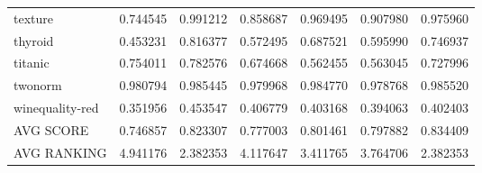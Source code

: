 \begin{tabular}{lrrrrrr}
texture         &         0.744545 &  0.991212 &                  0.858687 &       0.969495 &                  0.907980 &       0.975960 \\
thyroid         &         0.453231 &  0.816377 &                  0.572495 &       0.687521 &                  0.595990 &       0.746937 \\
titanic         &         0.754011 &  0.782576 &                  0.674668 &       0.562455 &                  0.563045 &       0.727996 \\
twonorm         &         0.980794 &  0.985445 &                  0.979968 &       0.984770 &                  0.978768 &       0.985520 \\
winequality-red &         0.351956 &  0.453547 &                  0.406779 &       0.403168 &                  0.394063 &       0.402403 \\
AVG SCORE       &         0.746857 &  0.823307 &                  0.777003 &       0.801461 &                  0.797882 &       0.834409 \\
AVG RANKING     &         4.941176 &  2.382353 &                  4.117647 &       3.411765 &                  3.764706 &       2.382353 \\
\bottomrule
\end{tabular}

